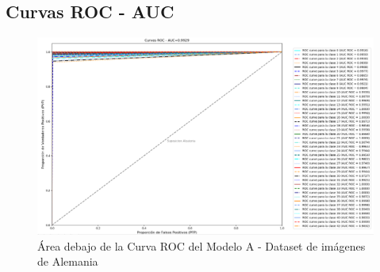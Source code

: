 		\subsection{Curvas ROC - AUC}  
					\begin{figure}[H]
						\includegraphics[width=\textwidth,height=\textheight,keepaspectratio]{images/desarrollo/testResults/german/ROC_curve_modelE} 
						\begin{center}
						\caption{\small{Área debajo de la Curva ROC del Modelo A - Dataset de imágenes de Alemania}}
						\vspace{-1em}
						{\small{\fontsize{10}{16.8}\selectfont {Fuente propia}}}
						\end{center}
						\vspace{-1.5em}
					\end{figure}
